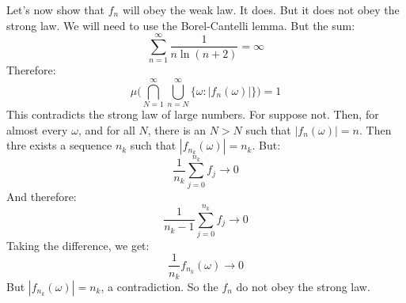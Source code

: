 \begin{lexample}
        Let's now show that $f_{n}$ will obey the weak law.
        It does. But it does not obey the strong law. We will
        need to use the Borel-Cantelli lemma. But the sum:
        \begin{equation}
            \sum_{n=1}^{\infty}\frac{1}{n\ln(n+2)}=\infty
        \end{equation}
        Therefore:
        \begin{equation}
            \mu\Big(\bigcap_{N=1}^{\infty}\bigcup_{n=N}^{\infty}
                \{\omega:|f_{n}(\omega)|\}\Big)=1
        \end{equation}
        This contradicts the strong law of large numbers. For
        suppose not. Then, for almost every $\omega$, and for
        all $N$, there is an $N>N$ such that
        $|f_{n}(\omega)|=n$. Then thre exists a sequence
        $n_{k}$ such that $|f_{n_{k}}(\omega)|=n_{k}$.
        But:
        \begin{equation}
            \frac{1}{n_{k}}\sum_{j=0}^{n_{k}}f_{j}\rightarrow{0}
        \end{equation}
        And therefore:
        \begin{equation}
            \frac{1}{n_{k}-1}\sum_{j=0}^{n_{k}}f_{j}
                \rightarrow{0}
        \end{equation}
        Taking the difference, we get:
        \begin{equation}
            \frac{1}{n_{k}}f_{n_{k}}(\omega)\rightarrow{0}
        \end{equation}
        But $|f_{n_{k}}(\omega)|=n_{k}$, a contradiction.
        So the $f_{n}$ do not obey the strong law.
    \end{lexample}
